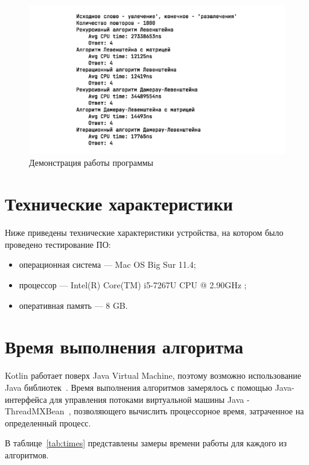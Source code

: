 \documentclass[12pt]{report}
\begin{document}
    \begin{figure}[H]
        \centering
        \includegraphics[scale=1]{img/workSample}
        \caption{Демонстрация работы программы}
        \label{fig:workSample}
    \end{figure}


    \section{Технические характеристики}
    Ниже приведены технические характеристики устройства, на котором было проведено тестирование ПО:
    \begin{itemize}
        \item операционная система --- Mac OS Big Sur 11.4;
        \item процессор --- Intel(R) Core(TM) i5-7267U CPU @ 2.90GHz \cite{i5};
        \item оперативная память --- 8 GB.
    \end{itemize}


    \section{Время выполнения алгоритма}
    Kotlin работает поверх Java Virtual Machine, поэтому возможно использование Java библиотек~\cite{kotlin}.
    Время выполнения алгоритмов замерялось с помощью Java-интерфейса для управления потоками
    виртуальной машины Java - ThreadMXBean~\cite{threadMXBean}, позволяющего вычислить процессорное время,
    затраченное на определенный процесс.

    В таблице~\ref{tab:times} представлены замеры времени работы для каждого из алгоритмов.
\end{document}
